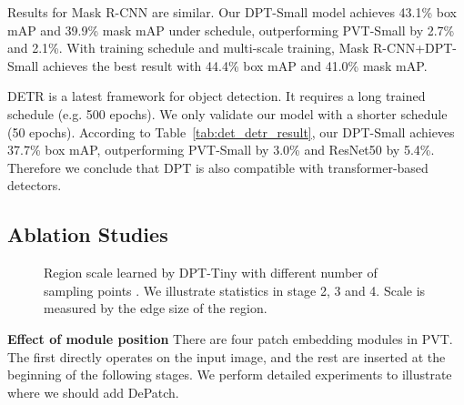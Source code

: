 \documentclass[sigconf,screen]{acmart}
\begin{document}
Results for Mask R-CNN are similar. Our DPT-Small model achieves 43.1\% box mAP and 39.9\% mask mAP under  schedule, outperforming PVT-Small by 2.7\% and 2.1\%. With  training schedule and multi-scale training, Mask R-CNN+DPT-Small achieves the best result with 44.4\% box mAP and 41.0\% mask mAP.

DETR is a latest framework for object detection. It requires a long trained schedule (e.g. 500 epochs). We only validate our model with a shorter schedule (50 epochs). According to Table~\ref{tab:det_detr_result}, our DPT-Small achieves 37.7\% box mAP, outperforming PVT-Small by 3.0\% and ResNet50 by 5.4\%. Therefore we conclude that DPT is also compatible with transformer-based detectors.

\subsection{Ablation Studies\label{sec:ablation}}
\begin{figure}[h]
  \centering
  \centering
  \centering
  \caption{Region scale learned by DPT-Tiny with different number of sampling points . We illustrate statistics in stage 2, 3 and 4. Scale is measured by the edge size of the region.}
  \label{fig:analyze_scale}
\end{figure}
\textbf{Effect of module position}
There are four patch embedding modules in PVT. The first directly operates on the input image, and the rest are inserted at the beginning of the following stages. We perform detailed experiments to illustrate where we should add DePatch.
\end{document}
